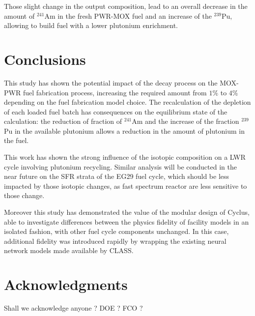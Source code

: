 \documentclass{anstrans}
\begin{document}
Those slight change in the output composition, lead to an overall decrease in
the amount of $^{241}$Am in the fresh PWR-MOX fuel and an increase of the
$^{239}$Pu, allowing to build fuel with a lower plutonium enrichment.


\section{Conclusions}

This study has shown the potential impact of the decay process on the MOX-PWR fuel
fabrication process, increasing the required amount from $1\%$ to $4\%$
depending on the fuel fabrication model choice. The recalculation of the 
depletion of each loaded fuel batch has consequences on the equilibrium
state of the calculation: the reduction of fraction of $^{241}$Am and the increase of the
fraction $^{239}$Pu in the available plutonium allows a reduction in the amount of
plutonium in the fuel.

This work has shown the strong influence of the isotopic composition on a LWR
cycle involving plutonium recycling. Similar analysis will be conducted in the
near future on the SFR strata of the EG29 fuel cycle, which should be less
impacted by those isotopic changes, as fast spectrum reactor are less sensitive
to those change.

Moreover this study has demonstrated the value of the modular design of
Cyclus, able to investigate differences between the physics fidelity of
facility models in an isolated fashion, with other fuel cycle components
unchanged.  In this case, additional fidelity was introduced rapidly by
wrapping the existing neural network models made available by CLASS.



%

\section{Acknowledgments}
Shall we acknowledge anyone ? DOE ? FCO ?




\end{document}

